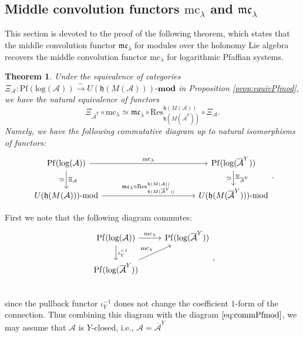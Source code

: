 \documentclass[a4paper,12pt]{article}
\newtheorem{thm}{Theorem}[section]
\theoremstyle{definition}
\theoremstyle{remark}
\begin{document}
\subsection{Middle convolution functors $\mathrm{mc}_{\lambda}$ and $\mathfrak{mc}_{\lambda}$}
This section is devoted to the proof of the following theorem, which states that 
the middle convolution functor $\mathfrak{mc}_{\lambda}$ for modules over the holonomy Lie algebra recovers the middle convolution functor $\mathrm{mc}_{\lambda}$ for logarithmic Pfaffian systems.
\begin{thm}\label{thm:commPfmod}
Under the equivalence of categories $\Xi_{\mathcal{A}}\colon \mathrm{Pf}(\mathrm{log}(\mathcal{A}))\xrightarrow{\sim} U(\mathfrak{h}(M(\mathcal{A})))\text{-}\mathbf{mod}$
in Proposition \ref{prop:equivPfmod}, we have the natural equivalence of functors
\[
	\Xi_{\overline{\mathcal{A}}^{Y}}\circ \mathrm{mc}_{\lambda}\simeq \mathfrak{mc}_{\lambda}\circ \mathrm{Res}_{\mathfrak{h}(M(\overline{\mathcal{A}}^{Y}))}^{\mathfrak{h}(M(\mathcal{A}))}\circ \Xi_{\mathcal{A}}.
\]
Namely, we have the following commutative diagram
up to natural isomorphisms of functors:
\[\begin{tikzcd}[column sep=4cm]
\mathrm{Pf}(\mathrm{log}(\mathcal{A}))\arrow[r,"\mathrm{mc}_{\lambda}"]\arrow[d,"\simeq"',"\Xi_{\mathcal{A}}"]&
\mathrm{Pf}(\mathrm{log}(\overline{\mathcal{A}}^{Y}))\arrow[d,"\simeq"', "\Xi_{\overline{\mathcal{A}}^{Y}}"]\\
U(\mathfrak{h}(M(\mathcal{A})))\text{-}\mathrm{mod}\arrow[r,"\mathfrak{mc}_{\lambda}\circ \mathrm{Res}_{\mathfrak{h}(M(\overline{\mathcal{A}}^{Y}))}^{\mathfrak{h}(M(\mathcal{A}))}"]&
U(\mathfrak{h}(M(\overline{\mathcal{A}}^{Y})))\text{-}\mathrm{mod}
\end{tikzcd}.
\]
\end{thm}
First we note that the following diagram commutes:
\[
	\begin{tikzcd}
	\mathrm{Pf}(\mathrm{log}(\mathcal{A}))\arrow[d,"\iota_{Y}^{-1}"]\arrow[r,"\mathrm{mc}_{\lambda}"]&\mathrm{Pf}(\mathrm{log}(\overline{\mathcal{A}}^{Y}))\\
	\mathrm{Pf}(\mathrm{log}(\overline{\mathcal{A}}^{Y}))\arrow[ur,"\mathrm{mc}_{\lambda}"]&\\
	\end{tikzcd},
\]
since the pullback functor $\iota_{Y}^{-1}$ dones not change the coefficient $1$-form of the connection.
Thus combining this diagram with the diagram $\eqref{eq:commPfmod}$,
we may assume that $\mathcal{A}$ is $Y$-closed, i.e., $\mathcal{A}=\overline{\mathcal{A}}^{Y}$
\end{document}
